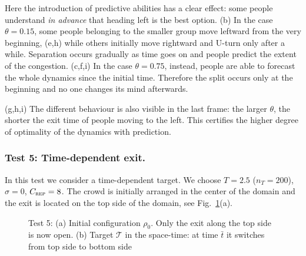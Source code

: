 \documentclass{cmslatex}
\renewcommand{\r}{\rho}
\begin{document}
Here the introduction of predictive abilities has a clear effect: some people understand \emph{in advance} that heading left is the best option. 
(b) In the case $\theta=0.15$, some people belonging to the smaller group move leftward from the very beginning, (e,h) while others initially move rightward and U-turn only after a while. Separation occurs gradually as time goes on and people predict the extent of the congestion.
(c,f,i) In the case $\theta=0.75$, instead, people are able to forecast the whole dynamics since the initial time. Therefore the split occurs only at the beginning and no one changes its mind afterwards.
 
(g,h,i) The different behaviour is also visible in the last frame: the larger $\theta$, the shorter the exit time of people moving to the left. This certifies the higher degree of optimality of the dynamics with prediction.

%
%
%
\subsubsection{Test 5: Time-dependent exit.}
In this test we consider a time-dependent target. 
We choose $T=2.5$ ($n_T=200$), $\sigma=0$, $C_\textsc{rep}=8$. 
The crowd is initially arranged in the center of the domain and the exit is located on the top side of the domain, see Fig.\ \ref{fig:test5_initial}(a). 
\begin{figure}[h!]
	\centering
	\hspace{10 mm}
	\caption{Test 5: (a) Initial configuration $\r_0$. Only the exit along the top side is now open. (b) Target $\mathcal T$ in the space-time: at time $\bar t$ it switches from top side to bottom side}
	\label{fig:test5_initial}
\end{figure}
\end{document}
